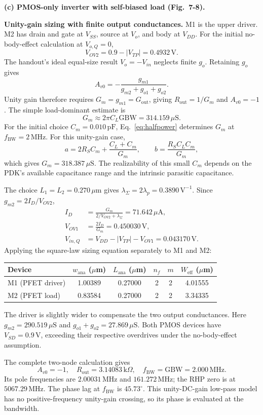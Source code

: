 \documentclass[12pt,letterpaper]{article}
\newcommand{\um}{\,\mu\mathrm{m}}
\newcommand{\uA}{\,\mu\mathrm{A}}
\newcommand{\uS}{\,\mu\mathrm{S}}
\newcommand{\kohm}{\,\mathrm{k}\Omega}
\newcommand{\V}{\,\mathrm{V}}
\newcommand{\MHz}{\,\mathrm{MHz}}
\newcommand{\pF}{\,\mathrm{pF}}
\begin{document}
\begin{enumerate}
\newpage
\textbf{(c) PMOS-only inverter with self-biased load (Fig.~7-8).}

\textbf{Unity-gain sizing with finite output conductances.}
M1 is the upper driver. M2 has drain and gate at $V_{SS}$,
source at $V_o$, and body at $V_{DD}$.
For the initial no-body-effect calculation at $V_{o,Q}=0$,
\[
V_{OV2}=0.9-|V_{TP}|=0.4932\V.
\]
The handout's ideal equal-size result $V_o=-V_{in}$ neglects
finite $g_o$. Retaining $g_o$ gives
\[
A_{v0}=-\frac{g_{m1}}{g_{m2}+g_{o1}+g_{o2}}.
\]
Unity gain therefore requires $G_m=g_{m1}=G_{\mathrm{out}}$, giving
$R_{\mathrm{out}}=1/G_m$ and $A_{v0}=-1$.
The simple load-dominant estimate is
\[
G_m\approx2\pi C_L\mathrm{GBW}=314.159\uS.
\]
For the initial choice $C_m=0.010\pF$, Eq.~\eqref{eq:halfpower}
determines $G_m$ at $f_{\mathrm{BW}}=2\MHz$.
For this unity-gain case,
\[
a=2R_SC_m+\frac{C_L+C_m}{G_m},\qquad
b=\frac{R_SC_LC_m}{G_m},
\]
which gives $G_m=318.387\uS$.
The realizability of this small $C_m$ depends on the PDK's
available capacitance range and the intrinsic parasitic capacitance.

The choice $L_1=L_2=0.270\um$ gives
$\lambda_\Sigma=2\lambda_p=0.3890\V^{-1}$.
Since $g_{m2}=2I_D/V_{OV2}$,
\begin{align*}
I_D&=\frac{G_m}{2/V_{OV2}+\lambda_\Sigma}=71.642\uA,\\
V_{OV1}&=\frac{2I_D}{G_m}=0.450030\V,\\
V_{in,Q}&=V_{DD}-|V_{TP}|-V_{OV1}=0.043170\V.
\end{align*}
Applying the square-law sizing equation separately to M1 and M2:
\begin{center}
\small
\begin{tabular}{@{}lccccc@{}}
\toprule
Device & $w_{\mathrm{ana}}$ ($\mu$m) & $L_{\mathrm{ana}}$ ($\mu$m) & $n_f$ & $m$ & $W_{\mathrm{eff}}$ ($\mu$m)\\
\midrule
M1 (PFET driver) & 1.00389 & 0.27000 & 2 & 2 & 4.01555\\
M2 (PFET load) & 0.83584 & 0.27000 & 2 & 2 & 3.34335\\
\bottomrule
\end{tabular}
\end{center}
The driver is slightly wider to compensate the two output
conductances. Here $g_{m2}=290.519\uS$ and
$g_{o1}+g_{o2}=27.869\uS$.
Both PMOS devices have $V_{SD}=0.9\V$, exceeding their
respective overdrives under the no-body-effect assumption.

The complete two-node calculation gives
\[
A_{v0}=-1,\quad R_{\mathrm{out}}=3.14083\kohm,\quad
f_{\mathrm{BW}}=\mathrm{GBW}=2.000\MHz.
\]
Its pole frequencies are $2.00031\MHz$ and $161.272\MHz$;
the RHP zero is at $5067.29\MHz$.
The phase lag at $f_{\mathrm{BW}}$ is $45.73^\circ$.
This unity-DC-gain low-pass model has no positive-frequency
unity-gain crossing, so its phase is evaluated at the bandwidth.


\end{enumerate}
\end{document}
